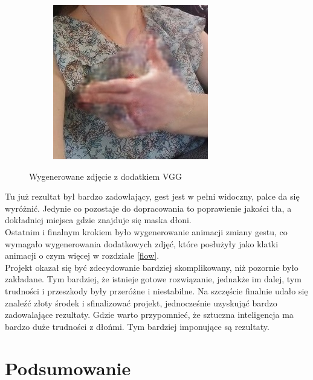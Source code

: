 \documentclass[12pt]{article}
\begin{document}
\begin{sloppypar}
{{\begin{figure}[H]
\begin{subfigure}{.32\textwidth}
      \end{subfigure}
      \begin{subfigure}{.32\textwidth}
        \centering
        \includegraphics[width=.8\linewidth]{pix2pix/result.jpg}
      \end{subfigure}
      \caption{Wygenerowane zdjęcie z dodatkiem VGG}
    \end{figure}
    Tu już rezultat był bardzo zadowlający, gest jest w pełni widoczny, palce da się wyróżnić. 
    Jedynie co pozostaje do dopracowania to poprawienie jakości tła, a dokładniej miejsca gdzie znajduje się maska dłoni. \\
    Ostatnim i finalnym krokiem było wygenerowanie animacji zmiany gestu, co wymagało wygenerowania dodatkowych zdjęć, które posłużyły jako klatki animacji o czym więcej w rozdziale \ref{flow}. \\
    Projekt okazał się być zdecydowanie bardziej skomplikowany, niż pozornie było zakładane. 
    Tym bardziej, że istnieje gotowe rozwiązanie, jednakże im dalej, tym trudności i przeszkody były przeróżne i niestabilne. 
    Na szczęście finalnie udało się znaleźć złoty środek i sfinalizować projekt, jednocześnie uzyskująć bardzo zadowalające rezultaty. 
    Gdzie warto przypomnieć, że sztuczna inteligencja ma bardzo duże trudności z dłońmi. Tym bardziej imponujące są rezultaty.
  }
}

\newpage

\section{Podsumowanie}
{
}
\end{sloppypar}
\end{document}
